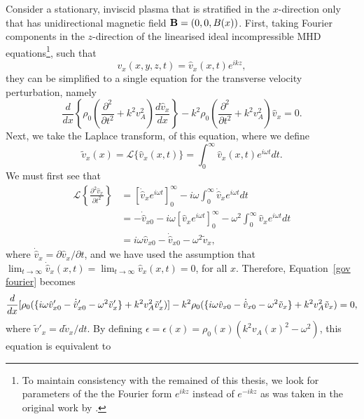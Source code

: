 \documentclass[12pt]{../style-files/ociamthesis}
\begin{document}
Consider a stationary, inviscid plasma that is stratified in the $x$-direction only that has unidirectional magnetic field $\mathbf{B} = (0, 0, B(x))$. First, taking Fourier components in the $z$-direction of the linearised ideal incompressible MHD equations\footnote{To maintain consistency with the remained of this thesis, we look for parameters of the the Fourier form $e^{ikz}$ instead of $e^{-ikz}$ as was taken in the original work by \cite{rae_etal81}.}, such that
\begin{equation}
v_x(x,y,z,t) = \hat{v}_x(x,t)e^{ikz},
\end{equation}
they can be simplified to a single equation for the transverse velocity perturbation, namely
\begin{equation}
\frac{d}{dx}\left\{\rho_0\left(\frac{\partial^2}{\partial t^2} + k^2v_A^2\right) \frac{d\hat{v}_x}{dx}\right\} - k^2\rho_0\left(\frac{\partial^2}{\partial t^2} + k^2v_A^2\right)\hat{v}_x = 0.
\label{gov fourier}
\end{equation}
Next, we take the Laplace transform, of this equation, where we define
\begin{equation}
\tilde{v}_x(x) = \mathcal{L}\{\hat{v}_x(x,t)\} = \int_0^\infty \hat{v}_x(x,t)e^{i\omega t} dt.
\end{equation}
We must first see that
\begin{align}
\mathcal{L}\left\{\frac{\partial^2 \hat{v}_x}{\partial t^2}\right\} & = [\dot{\hat{v}}_x e^{i\omega t}]_0^\infty - i\omega \int_0^\infty \dot{\hat{v}}_x e^{i\omega t} dt \\
& = -\dot{\hat{v}}_{x0} - i\omega[\hat{v}_x e^{i\omega t}]_0^\infty -\omega^2 \int_0^\infty \hat{v}_x e^{i\omega t} dt \\
& = i\omega \hat{v}_{x0} - \dot{\hat{v}}_{x0} - \omega^2 \tilde{v}_x,
\end{align}
where $\dot{\hat{v}}_x = \partial\hat{v}_x/\partial t$, and we have used the assumption that $\lim_{t \to \infty} \dot{\hat{v}}_{x}(x,t) = \lim_{t \to \infty} \hat{v}_{x}(x,t) = 0$, for all $x$. Therefore, Equation~\eqref{gov fourier} becomes
\begin{equation}
\frac{d}{dx} [\rho_0(\{i\omega \hat{v}_{x0}' - \dot{\hat{v}}_{x0}' - \omega^2\tilde{v}_x'\} + k^2v_A^2 \tilde{v}_x')] - k^2\rho_0 (\{i\omega \hat{v}_{x0} - \dot{\hat{v}}_{x0} - \omega^2\tilde{v}_x\} + k^2v_A^2 \tilde{v}_x) = 0, \notag
\end{equation}
where $\tilde{v}'_x = d\tilde{v}_x/d t$. By defining $\epsilon = \epsilon(x) = \rho_0(x)(k^2v_A(x)^2 - \omega^2)$, this equation is equivalent to
\end{document}
